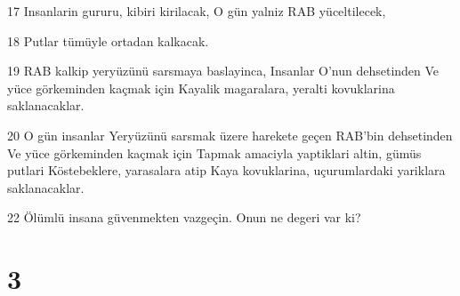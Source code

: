 \par 17 Insanlarin gururu, kibiri kirilacak, O gün yalniz RAB yüceltilecek,
\par 18 Putlar tümüyle ortadan kalkacak.
\par 19 RAB kalkip yeryüzünü sarsmaya baslayinca, Insanlar O'nun dehsetinden Ve yüce görkeminden kaçmak için Kayalik magaralara, yeralti kovuklarina saklanacaklar.
\par 20 O gün insanlar Yeryüzünü sarsmak üzere harekete geçen RAB'bin dehsetinden Ve yüce görkeminden kaçmak için Tapmak amaciyla yaptiklari altin, gümüs putlari Köstebeklere, yarasalara atip Kaya kovuklarina, uçurumlardaki yariklara saklanacaklar.
\par 22 Ölümlü insana güvenmekten vazgeçin. Onun ne degeri var ki?

\chapter{3}

